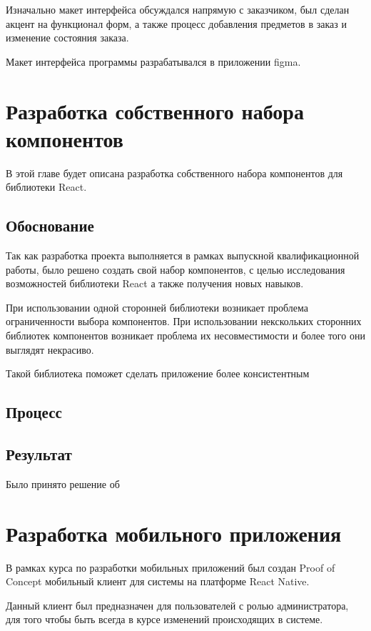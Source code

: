 \documentclass[a4paper,article,14pt]{extarticle}
\begin{document}
Изначально макет интерфейса обсуждался напрямую с заказчиком, был сделан акцент на функционал форм,
 а также процесс добавления предметов в заказ и изменение состояния заказа.

Макет интерфейса программы разрабатывался в приложении figma.




\section{Разработка собственного набора компонентов}

В этой главе будет описана разработка собственного набора компонентов для библиотеки React.

\subsection{Обоснование}

Так как разработка проекта выполняется в рамках выпускной квалификационной работы, было решено создать свой набор компонентов,
с целью исследования возможностей библиотеки React а также получения новых навыков.

При использовании одной сторонней библиотеки возникает проблема ограниченности выбора компонентов.
При использовании некскольких сторонних библиотек компонентов возникает проблема их несовместимости и более того они выглядят некрасиво.


Такой библиотека поможет сделать приложение более консистентным

\subsection{Процесс}

\subsection{Результат}

Было принято решение об 

\section{Разработка мобильного приложения}

В рамках курса по разработки мобильных приложений был создан Proof of Concept мобильный клиент 
для системы на платформе React Native.

Данный клиент был предназначен для пользователей с ролью администратора, для того
чтобы быть всегда в курсе изменений происходящих в системе.
\end{document}
